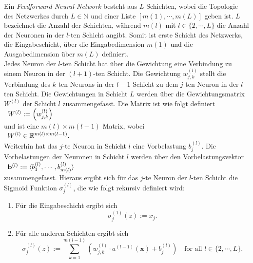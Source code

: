 \noindent
Ein \textit{Feedforward Neural Network} besteht aus $L$ Schichten, wobei die Topologie des Netzwerkes durch $L \in \mathbb{N}$ und einer Liste $[m(1),\cdots ,m(L)]$ geben ist. $L$ bezeichnet die Anzahl der Schichten, während $m(l)$ mit $l \in \{2,\cdots ,L\}$ die Anzahl der Neuronen in der $l$-ten Schicht angibt. Somit ist erste Schicht des Netzwerks, die Eingabeschicht, über die Eingabedimension $m(1)$ und die Ausgabedimension über $m(L)$ definiert. \\
Jedes Neuron der $l$-ten Schicht hat über die Gewichtung eine Verbindung zu einem Neuron in der $(l+1)$-ten Schicht. Die Gewichtung $w_{j,k}^{(l)}$ stellt die Verbindung des $k$-ten Neurons in der $l-1$ Schicht zu dem $j$-ten Neuron in der $l$-ten Schicht. Die Gewichtungen in Schicht $L$ werden über die Gewichtungsmatrix $W^{(l)}$ der Schicht $l$ zusammengefasst. Die Matrix ist wie folgt definiert \\[0.2cm]
\hspace*{1.3cm}
$
\begin{array}[t]{lclll}
	W^{(l)} := \left( w_{j,k}^{(l)}\right)
\end{array}
$
\\[0.2cm]
und ist eine $m(l)\times m(l-1)$ Matrix, wobei \\[0.2cm]
\hspace*{1.3cm}
$
\begin{array}[t]{lclll}
	W^{(l)} \in \mathbb{R}^{m(l)\times m(l-1)}.
\end{array}
$
\\[0.2cm]
Weiterhin hat das $j$-te Neuron in Schicht $l$ eine Vorbelastung $b_j^{(l)}$. Die Vorbelastungen der Neuronen in Schicht $l$ werden über den Vorbelastungsvektor \\[0.2cm]
\hspace*{1.3cm}
$
\begin{array}[t]{lclll}
	\mathbf{b}^{(l)} := \langle b_1^{(l)},\cdots ,b_{m(l)}^{(l)}\rangle
\end{array}
$
\\[0.2cm]
zusammengefasst. Hieraus ergibt sich für das $j$-te Neuron der $l$-ten Schicht die Sigmoid Funktion $\sigma_j^{(l)}$, die wie folgt rekursiv definiert wird:
\begin{enumerate}
	\item Für die Eingabeschicht ergibt sich 
			\begin{equation}
        	\label{eq:feedforward1}
      			 \sigma_j^{(1)}(z) := x_j.
     		\end{equation}
    \item Für alle anderen Schichten ergibt sich
    		\begin{equation}
         	\label{eq:feedforward2}
         		\sigma_j^{(l)}(z) := 
             	\sum\limits_{k=1}^{m(l-1)} \left(w_{j,k}^{(l)}\cdot a^{(l-1)}(\mathbf{x}) + b_{j}^{(l)}\right) \quad \mbox{for all $l \in \{2, \cdots, L\}$}.
			\end{equation}
\end{enumerate}

